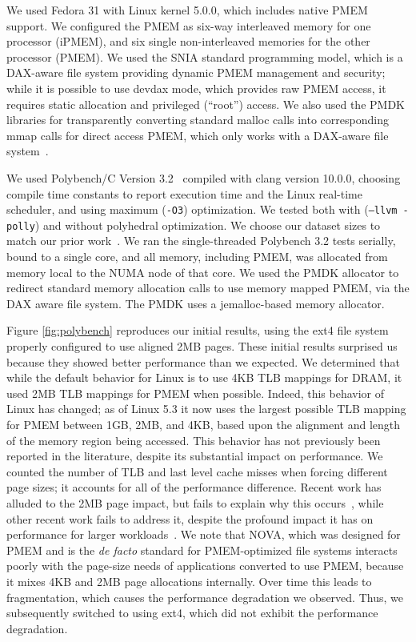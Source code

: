 We used Fedora 31 with Linux kernel 5.0.0, which includes native PMEM support. We configured the PMEM as six-way interleaved memory for one processor (iPMEM), and six single non-interleaved memories for the other processor (PMEM).  We used the SNIA standard programming model, which is a DAX-aware file system providing dynamic PMEM management and security; while it is possible to use devdax mode, which provides raw PMEM access, it requires static allocation and privileged (``root'') access.  We also used the PMDK libraries for transparently converting standard malloc calls into corresponding mmap calls for direct access PMEM, which only works with a DAX-aware file system~\cite{PMDK}.


We used Polybench/C Version 3.2~\cite{polybench,yuki2014understanding,yuki2015polybench} compiled with clang version 10.0.0, choosing compile time constants to report execution time and the Linux real-time scheduler, and using maximum (\texttt{-O3}) optimization. We tested both with (\texttt{--llvm -polly}) and without polyhedral optimization. We choose our dataset sizes to match our prior work~\cite{doudali2017comerge}.  We ran the single-threaded Polybench 3.2 tests serially, bound to a single core, and all memory, including PMEM, was allocated from memory local to the NUMA node of that core.  We used the PMDK allocator to redirect standard memory allocation calls to use memory mapped PMEM, via the DAX aware file system.  The PMDK uses a jemalloc-based memory allocator.

Figure \ref{fig:polybench} reproduces our initial results, using the ext4 file system properly configured to use aligned 2MB pages.  These initial results surprised us because they showed better performance than we expected.  We determined that while the default behavior for Linux is to use 4KB TLB mappings for DRAM, it used 2MB TLB mappings for PMEM when possible. Indeed, this behavior of Linux has changed; as of Linux 5.3 it now uses the largest possible TLB mapping for PMEM between 1GB, 2MB, and 4KB, based upon the alignment and length of the memory region being accessed.  This behavior has not previously been reported in the literature, despite its substantial impact on performance.  We counted the number of TLB and last level cache misses when forcing different page sizes; it accounts for all of the performance difference. Recent work has alluded to the 2MB page impact, but fails to explain why this occurs~\cite{kadekodi2019splitfs}, while other recent work fails to address it, despite the profound impact it has on performance for larger workloads~\cite{dong2019performance,peng2019system}. We note that NOVA, which was designed for PMEM and is the \textit{de facto} standard for PMEM-optimized file systems interacts poorly with the page-size needs of applications converted to use PMEM, because it mixes 4KB and 2MB page allocations internally.  Over time this leads to fragmentation, which causes the performance degradation we observed.  Thus, we subsequently switched to using ext4, which did not exhibit the performance degradation.

